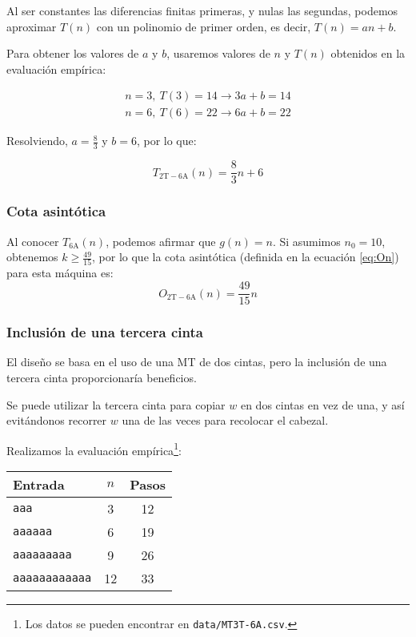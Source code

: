Al ser constantes las diferencias finitas primeras, y nulas las segundas, podemos aproximar $T(n)$ con un polinomio de primer orden, es decir, $T(n) = an + b$.\medskip

Para obtener los valores de $a$ y $b$, usaremos valores de $n$ y $T(n)$ obtenidos en la evaluación empírica:

\begin{subequations}
    \begin{gather}
        n = 3,\ T(3) = 14 \rightarrow 3a + b = 14 \\
        n = 6,\ T(6) = 22 \rightarrow 6a + b = 22
    \end{gather}
\end{subequations}

Resolviendo, $a=\frac{8}{3}$ y $b=6$, por lo que:

\begin{equation}
    T_{\mathrm{2T-6A}}(n) = \frac{8}{3}n + 6
\end{equation}


\subsubsection*{Cota asintótica}
Al conocer $T_{\mathrm{6A}}(n)$, podemos afirmar que $g(n) = n$. Si asumimos $n_0 = 10$, obtenemos $k \geq \frac{49}{15}$, por lo que la cota asintótica (definida en la ecuación \ref{eq:On}) para esta máquina es:
\begin{equation}
    O_{\mathrm{2T-6A}}(n) = \frac{49}{15} n
\end{equation}



\subsubsection*{Inclusión de una tercera cinta} \label{sec:MT3T-6A}
El diseño se basa en el uso de una MT de dos cintas, pero la inclusión de una tercera cinta proporcionaría beneficios.

Se puede utilizar la tercera cinta para copiar $w$ en dos cintas en vez de una, y así evitándonos recorrer $w$ una de las veces para recolocar el cabezal.


Realizamos la evaluación empírica\footnote{Los datos se pueden encontrar en \texttt{data/MT3T-6A.csv}.}:

\begin{table}[h]
    \centering
    \begin{tabular}{lcc}
        Entrada & $n$ & Pasos \\
        \hline
        \texttt{aaa}                &  3  & 12 \\
        \texttt{aaaaaa}             &  6  & 19 \\
        \texttt{aaaaaaaaa}          &  9  & 26 \\
        \texttt{aaaaaaaaaaaa}       & 12  & 33 \\
    \end{tabular}
\end{table}

